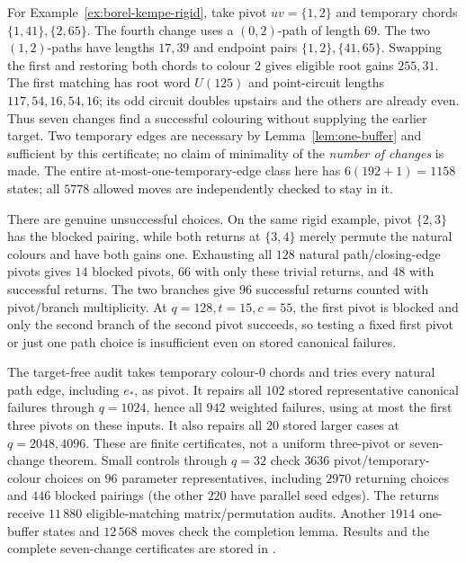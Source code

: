 \documentclass[11pt,a4paper]{article}
\theoremstyle{definition}
\theoremstyle{remark}
\begin{document}
For Example~\ref{ex:borel-kempe-rigid}, take pivot $uv=\{1,2\}$ and temporary chords $\{1,41\},\{2,65\}$.  The fourth change uses a $(0,2)$-path of length $69$.  The two $(1,2)$-paths have lengths $17,39$ and endpoint pairs $\{1,2\},\{41,65\}$.  Swapping the first and restoring both chords to colour $2$ gives eligible root gains $255,31$.  The first matching has root word $U(125)$ and point-circuit lengths $117,54,16,54,16$; its odd circuit doubles upstairs and the others are already even.  Thus seven changes find a successful colouring without supplying the earlier target.  Two temporary edges are necessary by Lemma~\ref{lem:one-buffer} and sufficient by this certificate; no claim of minimality of the \emph{number of changes} is made.  The entire at-most-one-temporary-edge class here has $6(192+1)=1158$ states; all $5778$ allowed moves are independently checked to stay in it.

There are genuine unsuccessful choices.  On the same rigid example, pivot $\{2,3\}$ has the blocked pairing, while both returns at $\{3,4\}$ merely permute the natural colours and have both gains one.  Exhausting all $128$ natural path/closing-edge pivots gives $14$ blocked pivots, $66$ with only these trivial returns, and $48$ with successful returns.  The two branches give $96$ successful returns counted with pivot/branch multiplicity.  At $q=128,t=15,c=55$, the first pivot is blocked and only the second branch of the second pivot succeeds, so testing a fixed first pivot or just one path choice is insufficient even on stored canonical failures.

The target-free audit  takes temporary colour-$0$ chords and tries every natural path edge, including $e_*$, as pivot.  It repairs all $102$ stored representative canonical failures through $q=1024$, hence all $942$ weighted failures, using at most the first three pivots on these inputs.  It also repairs all $20$ stored larger cases at $q=2048,4096$.  These are finite certificates, not a uniform three-pivot or seven-change theorem.  Small controls through $q=32$ check $3636$ pivot/temporary-colour choices on $96$ parameter representatives, including $2970$ returning choices and $446$ blocked pairings (the other $220$ have parallel seed edges).  The returns receive $11\,880$ eligible-matching matrix/permutation audits.  Another $1914$ one-buffer states and $12\,568$ moves check the completion lemma.  Results and the complete seven-change certificates are stored in .
\end{document}
